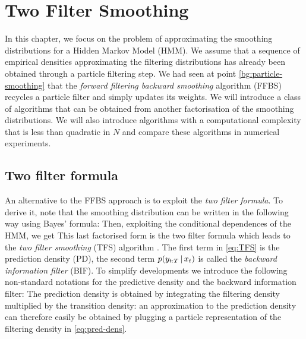 
\section{Two Filter Smoothing}
In this chapter, we focus on the problem of approximating the smoothing distributions for a Hidden Markov Model (HMM). 
We assume that a sequence of empirical densities approximating the filtering distributions has already been obtained through a particle filtering step.
We had seen at point \ref{bg:particle-smoothing} that the \emph{forward filtering backward smoothing} algorithm (FFBS) recycles a particle filter and simply updates its weights. We will introduce a class of algorithms that can be obtained from another factorisation of the smoothing distributions. We will also introduce algorithms with a computational complexity that is less than quadratic in $N$ and compare these algorithms in numerical experiments.

\subsection{Two filter formula}
An alternative to the FFBS approach is to exploit the \emph{two filter formula}. 
To derive it, note that the smoothing distribution can be written in the following way using Bayes' formula:
%
% 
Then, exploiting the conditional dependences of the HMM, we get
%
%
This last factorised form is the two filter formula which leads to the \emph{two filter smoothing} (TFS) algorithm \citep{bresler86, kitagawa96}. 
The first term in \eqref{eq:TFS} is the prediction density (PD), 
the second term $p(y_{t:T}\,|\, x_{t})$ is called the \emph{backward information filter} (BIF). To simplify developments we introduce the following non-standard notations for the predictive density and the backward information filter:
%
%
The prediction density is obtained by integrating the filtering density multiplied by the transition density:
%
%
an approximation to the prediction density can therefore easily be obtained by plugging a particle representation of the filtering density in \eqref{eq:pred-dens}. 
